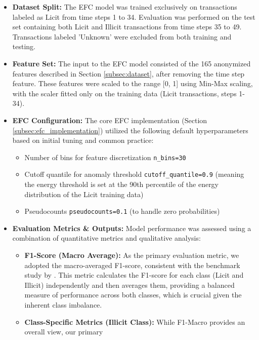 \documentclass[12pt]{article}
\begin{document}
\begin{itemize}
    \item \textbf{Dataset Split:} The EFC model was trained exclusively on transactions labeled as Licit from time steps
      1 to 34. Evaluation was performed on the test set containing both Licit and Illicit transactions from time steps
      35 to 49. Transactions labeled 'Unknown' were excluded from both training and testing.
    \item \textbf{Feature Set:} The input to the EFC model consisted of the 165 anonymized features described in Section
      \ref{subsec:dataset}, after removing the time step feature. These features were scaled to the range [0, 1] using
      Min-Max scaling, with the scaler fitted only on the training data (Licit transactions, steps 1-34).
    \item \textbf{EFC Configuration:} The core EFC implementation (Section \ref{subsec:efc_implementation}) utilized the
      following default hyperparameters based on initial tuning and common practice:
        \begin{itemize}
            \item Number of bins for feature discretization \texttt{n\_bins=30}
            \item Cutoff quantile for anomaly threshold \texttt{cutoff\_quantile=0.9} (meaning the energy threshold is set at
              the 90th percentile of the energy distribution of the Licit training data)
            \item Pseudocounts \texttt{pseudocounts=0.1} (to handle zero probabilities)
        \end{itemize}
        \item \textbf{Evaluation Metrics \& Outputs:} Model performance was assessed using a combination of quantitative metrics and qualitative analysis:
          \begin{itemize}
              \item \textbf{F1-Score (Macro Average):} As the primary evaluation metric, we adopted the macro-averaged F1-score,
                consistent with the benchmark study by \cite{lorenz2021machinelearningmethodsdetect}. This metric calculates the
                F1-score for each class (Licit and Illicit) independently and then averages them, providing a balanced measure
                of performance across both classes, which is crucial given the inherent class imbalance.
              \item \textbf{Class-Specific Metrics (Illicit Class):} While F1-Macro provides an overall view, our primary

\end{itemize}
\end{itemize}
\end{document}
